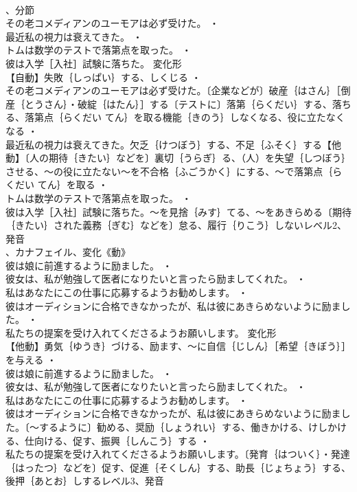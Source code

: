 \documentclass[8pt]{extreport}
\begin{document}
\begin{CJK}{UTF8}{min}
\\	、分節
\\	その老コメディアンのユーモアは必ず受けた。 ・
\\	最近私の視力は衰えてきた。 ・
\\	トムは数学のテストで落第点を取った。 ・
\\	彼は入学［入社］試験に落ちた。	変化形 
\\	【自動】失敗｛しっぱい｝する、しくじる ・
\\	その老コメディアンのユーモアは必ず受けた。〔企業などが〕破産｛はさん｝［倒産｛とうさん｝・破綻｛はたん｝］する〔テストに〕落第｛らくだい｝する、落ちる、落第点｛らくだい てん｝を取る機能｛きのう｝しなくなる、役に立たなくなる ・
\\	最近私の視力は衰えてきた。欠乏｛けつぼう｝する、不足｛ふそく｝する【他動】〔人の期待｛きたい｝などを〕裏切｛うらぎ｝る、（人）を失望｛しつぼう｝させる、～の役に立たない～を不合格｛ふごうかく｝にする、～で落第点｛らくだい てん｝を取る ・
\\	トムは数学のテストで落第点を取った。 ・
\\	彼は入学［入社］試験に落ちた。～を見捨｛みす｝てる、～をあきらめる〔期待｛きたい｝された義務｛ぎむ｝などを〕怠る、履行｛りこう｝しないレベル2、発音
\\	、カナフェイル、変化《動》
\\	彼は娘に前進するように励ました。 ・
\\	彼女は、私が勉強して医者になりたいと言ったら励ましてくれた。 ・
\\	私はあなたにこの仕事に応募するようお勧めします。 ・
\\	彼はオーディションに合格できなかったが、私は彼にあきらめないように励ました。 ・
\\	私たちの提案を受け入れてくださるようお願いします。	変化形 
\\	【他動】勇気｛ゆうき｝づける、励ます、～に自信｛じしん｝［希望｛きぼう｝］を与える ・
\\	彼は娘に前進するように励ました。 ・
\\	彼女は、私が勉強して医者になりたいと言ったら励ましてくれた。 ・
\\	私はあなたにこの仕事に応募するようお勧めします。 ・
\\	彼はオーディションに合格できなかったが、私は彼にあきらめないように励ました。〔～するように〕勧める、奨励｛しょうれい｝する、働きかける、けしかける、仕向ける、促す、振興｛しんこう｝する ・
\\	私たちの提案を受け入れてくださるようお願いします。〔発育｛はついく｝・発達｛はったつ｝などを〕促す、促進｛そくしん｝する、助長｛じょちょう｝する、後押｛あとお｝しするレベル3、発音

\end{CJK}
\end{document}
